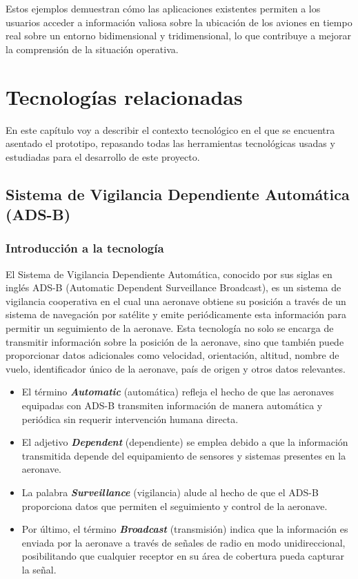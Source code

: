 \documentclass[a4paper, 11pt]{book}
\begin{document}
Estos ejemplos demuestran cómo las aplicaciones existentes permiten a los usuarios acceder a información valiosa sobre la ubicación de los aviones en tiempo real sobre un entorno bidimensional y tridimensional, lo que contribuye a mejorar la comprensión de la situación operativa.

\chapter{Tecnologías relacionadas}
\label{chap:tecnologias}
En este capítulo voy a describir el contexto tecnológico en el que se encuentra asentado el prototipo, repasando todas las herramientas tecnológicas usadas y estudiadas para el desarrollo de este proyecto.
\section{Sistema de Vigilancia Dependiente Automática (ADS-B)}
\label{sec:adsb}
\subsection{Introducción a la tecnología}
El Sistema de Vigilancia Dependiente Automática, conocido por sus siglas en inglés \textsc{ADS-B} (Automatic Dependent Surveillance Broadcast), es un sistema de vigilancia cooperativa en el cual una aeronave obtiene su posición a través de un sistema de navegación por satélite y emite periódicamente esta información para permitir un seguimiento de la aeronave.
Esta tecnología no solo se encarga de transmitir información sobre la posición de la aeronave, sino que también puede proporcionar datos adicionales como velocidad, orientación, altitud, nombre de vuelo, identificador único de la aeronave, país de origen y otros datos relevantes.
\begin{itemize}
	\item El término \textbf{\emph{Automatic}} (automática) refleja el hecho de que las aeronaves equipadas con \textsc{ADS-B} transmiten información de manera automática y periódica sin requerir intervención humana directa.
	\item El adjetivo \textbf{\emph{Dependent}} (dependiente) se emplea debido a que la información transmitida depende del equipamiento de sensores y sistemas presentes en la aeronave.
	\item La palabra \textbf{\emph{Surveillance}} (vigilancia) alude al hecho de que el \textsc{ADS-B} proporciona datos que permiten el seguimiento y control de la aeronave.
	\item Por último, el término\textbf{ \emph{Broadcast}} (transmisión) indica que la información es enviada por la aeronave a través de señales de radio en modo unidireccional, posibilitando que cualquier receptor en su área de cobertura pueda capturar la señal.
\end{itemize}
\end{document}
